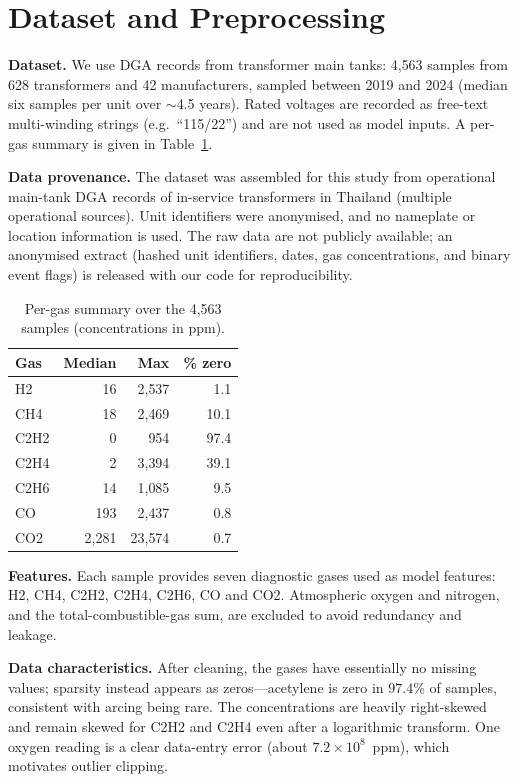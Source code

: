 \section{Dataset and Preprocessing}
\label{sec:data}

\textbf{Dataset.}
We use DGA records from transformer main tanks: 4{,}563 samples from 628 transformers and 42
manufacturers, sampled between 2019 and 2024 (median six samples per unit over $\sim$4.5 years).
Rated voltages are recorded as free-text multi-winding strings (e.g.\ ``115/22'') and are not
used as model inputs. A per-gas summary is given in Table~\ref{tab:gases}.

\textbf{Data provenance.}
The dataset was assembled for this study from operational main-tank DGA records of in-service
transformers in Thailand (multiple operational sources). Unit identifiers were anonymised, and
no nameplate or location information is used. The raw data are not publicly available; an
anonymised extract (hashed unit identifiers, dates, gas concentrations, and binary event flags)
is released with our code for reproducibility.

\begin{table}[t]
\centering
\caption{Per-gas summary over the 4{,}563 samples (concentrations in ppm).}
\label{tab:gases}
\begin{tabular}{lrrr}
\toprule
Gas & Median & Max & \% zero \\
\midrule
H2   & 16    & 2{,}537  & 1.1 \\
CH4  & 18    & 2{,}469  & 10.1 \\
C2H2 & 0     & 954      & 97.4 \\
C2H4 & 2     & 3{,}394  & 39.1 \\
C2H6 & 14    & 1{,}085  & 9.5 \\
CO   & 193   & 2{,}437  & 0.8 \\
CO2  & 2{,}281 & 23{,}574 & 0.7 \\
\bottomrule
\end{tabular}
\end{table}

\textbf{Features.}
Each sample provides seven diagnostic gases used as model features: H2, CH4, C2H2, C2H4,
C2H6, CO and CO2. Atmospheric oxygen and nitrogen, and the total-combustible-gas sum, are
excluded to avoid redundancy and leakage.

\textbf{Data characteristics.}
After cleaning, the gases have essentially no missing values; sparsity instead appears as
zeros---acetylene is zero in $97.4\%$ of samples, consistent with arcing being rare. The
concentrations are heavily right-skewed and remain skewed for C2H2 and C2H4 even after a
logarithmic transform. One oxygen reading is a clear data-entry error (about
$7.2\times10^{8}$~ppm), which motivates outlier clipping.

